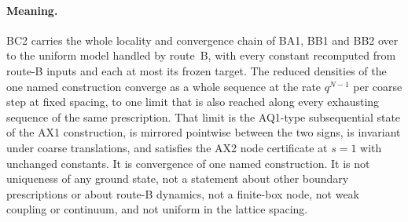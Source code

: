 \paragraph{Meaning.} BC2 carries the whole locality and convergence chain of
BA1, BB1 and BB2 over to the uniform model handled by route~B, with every
constant recomputed from route-B inputs and each at most its frozen target.
The reduced densities of the one named construction converge as a whole
sequence at the rate $q^{N-1}$ per coarse step at fixed spacing, to one limit
that is also reached along every exhausting sequence of the same
prescription. That limit is the AQ1-type subsequential state of the AX1
construction, is mirrored pointwise between the two signs, is invariant
under coarse translations, and satisfies the AX2 node certificate at $s=1$
with unchanged constants. It is convergence of one named construction. It is
not uniqueness of any ground state, not a statement about other boundary
prescriptions or about route-B dynamics, not a finite-box node, not weak
coupling or continuum, and not uniform in the lattice spacing.

